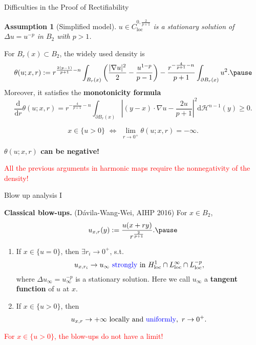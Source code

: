 \documentclass[11pt]{beamer}
\newcommand{\pa}{\partial}
\newcommand{\ud}{\mathrm{d}}
\newcommand{\HH}{\mathcal{H}}
\newcommand{\ift}{\infty}
\newcommand{\f}{\frac}
\newcommand{\na}{\nabla}
\DeclareMathOperator{\loc}{loc}
\def\({\left(}                 \def\){\right)}
\theoremstyle{plain}
\newtheorem{assum}[thm]{Assumption}
\theoremstyle{definition}
\begin{document}
\begin{frame}{Difficulties in the Proof of Rectifiability}

\begin{assum}[Simplified model]\label{assum1}
$ u\in C_{\loc}^{0,\f{2}{p+1}} $ is a stationary solution of $ \Delta u=u^{-p} $ in $ B_2 $ with $ p>1 $.
\end{assum}\pause

\vspace{1em}

For $ B_r(x)\subset B_2 $, the widely used density is
$$
\theta(u;x,r):=r^{\f{2(p-1)}{p+1}-n}\int_{B_r(x)}\(\f{|\na u|^2}{2}-\f{u^{1-p}}{p-1}\)-\f{ r^{-\f{4}{p+1}-n}}{p+1}\int_{\pa B_r(x)}u^2.\pause
$$
Moreover, it satisfies the \textbf{monotonicity formula}
$$
\f{\ud}{\ud r}\theta(u;x,r)=r^{-\f{4}{p+1}-n}\int_{\pa B_r(x)}\left|(y-x)\cdot\na u-\f{2u}{p+1}\right|^2\ud\HH^{n-1}(y)\geq 0.
$$

$$
x\in\{u>0\}\,\,\Leftrightarrow\,\,\lim_{r\to 0^+}\theta(u;x,r)=-\ift.
$$

\centerline{\textbf{$ \theta(u;x,r) $ can be negative!}}\pause

\vspace{1em}

\textcolor{red}{All the previous arguments in harmonic maps require the nonnegativity of the density!}

\end{frame}

\begin{frame}{Blow up analysis I}

\textbf{Classical blow-ups.} (D\'{a}vila-Wang-Wei, AIHP 2016) For $ x\in B_2 $,
$$
u_{x,r}(y):=\f{u(x+ry)}{r^{\f{2}{p+1}}}.\pause
$$

\begin{enumerate}
\item If $ x\in\{u=0\} $, then $ \exists r_i\to 0^+ $, s.t.
$$
u_{x,r_i}\to u_{\ift}\text{ \textcolor{blue}{strongly} in }H_{\loc}^1\cap L_{\loc}^{\ift}\cap L_{\loc}^{-p},
$$
where $ \Delta u_{\ift}=u_{\ift}^{-p} $ is a stationary solution. Here we call $ u_{\ift} $ a \textbf{tangent function} of $ u $ at $ x $.\pause
\item If $ x\in\{u>0\} $, then
$$
u_{x,r}\to +\ift\text{ locally and \textcolor{blue}{uniformly}},\,\,r\to 0^+.
$$
\end{enumerate}\pause

\centerline{\textcolor{red}{For $ x\in\{u>0\} $, the blow-ups do not have a limit!}}
\end{frame}
\end{document}
